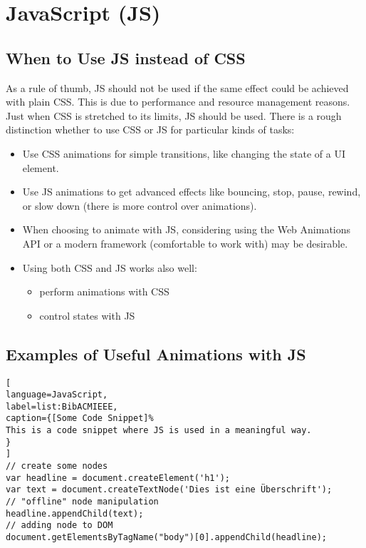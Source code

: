 %
%
% 
% 
% 


\chapter{JavaScript (JS)}

\label{chap:JS}


\section{When to Use JS instead of CSS}

As a rule of thumb, JS should not be used if the same effect could be achieved with plain CSS. This is due to performance and resource management reasons. Just when CSS is stretched to its limits, JS should be used. There is a rough distinction whether to use CSS or JS for particular kinds of tasks:
\begin{itemize}
	\item Use CSS animations for simple transitions, like changing the state of a UI element.
	\item Use JS animations to get advanced effects like bouncing, stop, pause, rewind, or slow down (there is more control over animations).
	\item When choosing to animate with JS, considering using the Web Animations API or a modern framework (comfortable to work with) may be desirable.
	\item Using both CSS and JS works also well:
	\begin{itemize}
		\item perform animations with CSS
		\item control states with JS
	\end{itemize}
\end{itemize}


\section{Examples of Useful Animations with JS}



\begin{lstlisting}[
language=JavaScript,
label=list:BibACMIEEE,
caption={[Some Code Snippet]%
This is a code snippet where JS is used in a meaningful way.
}
]
// create some nodes
var headline = document.createElement('h1');
var text = document.createTextNode('Dies ist eine Überschrift');
// "offline" node manipulation
headline.appendChild(text);
// adding node to DOM
document.getElementsByTagName("body")[0].appendChild(headline);
\end{lstlisting}